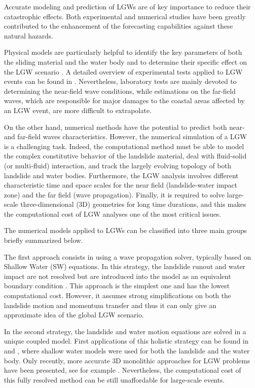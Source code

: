 Accurate modeling and prediction of LGWs are of key importance to reduce their catastrophic effects.
Both experimental and numerical studies have been greatly contributed to the enhancement of the forecasting capabilities against these natural hazards.

Physical models are particularly helpful to identify the key parameters of both the sliding material and the water body and to determine their specific effect on the LGW scenario \cite{noda1970water, fritz2004near, heller2011wave, mohammed2012physical, romano2016, mulligan2017, evers2019spatial}. A detailed overview of experimental tests applied to LGW events can be found in \cite{yavari2017subaerial}. Nevertheless, laboratory tests are mainly devoted to determining the near-field wave conditions, while estimations on the far-field waves, which are responsible for major damages to the coastal areas affected by an LGW event, are more difficult to extrapolate.

On the other hand, numerical methods have the potential to predict both near- and far-field waves characteristics. However, the numerical simulation of a LGW is a challenging task. Indeed, the computational method must be able to model the complex constitutive behavior of the landslide material, deal with fluid-solid (or multi-fluid) interaction, and track the largely evolving topology of both landslide and water bodies. Furthermore, the LGW analysis involves different characteristic time and space scales for the near field (landslide-water impact zone) and the far field (wave propagation). Finally, it is required to solve large-scale three-dimensional (3D) geometries for long time durations, and this makes the computational cost of LGW analyses one of the most critical issues.

The numerical models applied to LGWs can be classified into three main groups \cite{yavari2016numerical} briefly summarized below.

The first approach consists in using a wave propagation solver, typically based on Shallow Water (SW) equations. In this strategy, the landslide runout and water impact are not resolved but are introduced into the model as an equivalent boundary condition \cite{waythomas2003numerical, ataie2008mapping}. This approach is the simplest one and has the lowest computational cost. However, it assumes strong simplifications on both the landslide motion and momentum transfer and thus it can only give an approximate idea of the global LGW scenario.

In the second strategy, the landslide and water motion equations are solved in a unique coupled model. First applications of this holistic strategy can be found in \cite{kelfoun2010landslide} and \cite{giachetti2011numerical}, where shallow water models were used for both the landslide and the water body.
Only recently, more accurate 3D monolithic approaches for LGW problems have been presented, see for example
\cite{vacondio20133d, CrostaVajont, franci20203dA, franci20203dB, xu2021sph, terada2021}. Nevertheless, the computational cost of this fully resolved method can be still unaffordable for large-scale events.

